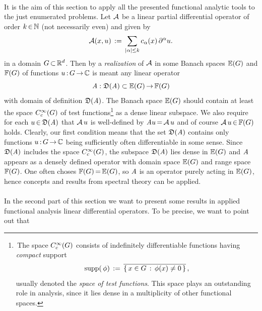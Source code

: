 \documentclass[11pt,twoside]{article}
\begin{document}
\paragraph{} %
It is the aim of this section to apply
all the presented functional analytic tools to the just enumerated problems.
Let ${\mathcal{A}}$ be a linear partial differential operator of order $k {\,\in\,} {\mathbb{N}}$
(not necessarily even) and given by
\begin{equation}\label{ANY_ORDER_LPDO}
\A(x,u) \eqdef
\sum_{\abs{\alpha} \leq k} c_{\alpha}(x) \, \PA u.
\end{equation}
in a domain $G {\,\subset\,} {\mathbb{R}}^d$.
Then by a \textit{realization} of ${\mathcal{A}}$ in some Banach spaces
$\mathbb{E}(G)$ and $\mathbb{F}(G)$ of functions $u {\,:\,} G {\,\to\,} {\mathbb{C}}$
is meant any linear operator
\[
\mathit{A}: \mathfrak{D}(\mathit{A}) \subset \mathbb{E}(G) {\,\to\,} \mathbb{F}(G)
\]
with domain of definition $\mathfrak{D}(\mathit{A})$.
The Banach space $\mathbb{E}(G)$ should contain at least
the space $C_c^{\infty}(G)$ of test functions\footnote{
\,The space $C_c^{\infty}(G)$ consists of indefinitely differentiable functions
having \textit{compact} support
\[
\operatorname{supp}(\,\phi) \,:=\, \overline{\{ \, x \in G \,: \, \phi(x) \neq 0 \, \}}\,,
\]
usually denoted the \textit{space of test functions}.
This space plays an out\-standing role in analysis,
since it lies dense in a multiplicity of other functional spaces.}
as a dense linear subspace.
We also require for each $u {\,\in\,} \mathfrak{D}(\mathit{A})$ that
${\mathcal{A}} \, u$ is well-defined by $\mathit{A} u {\,=\,} {\mathcal{A}} \, u$ and of course
${\mathcal{A}} \, u {\,\in\,} \mathbb{F}(G)$ holds.
Clearly,
our first condition means that the set $\mathfrak{D}(\mathit{A})$
contains only functions $u {\,:\,} G {\,\to\,} {\mathbb{C}}$
being sufficiently often differentiable in some sense.
Since $\mathfrak{D}(\mathit{A})$ includes the space $C_c^{\infty}(G)$,
the subspace $\mathfrak{D}(\mathit{A})$ lies dense in $\mathbb{E}(G)$
and $\mathit{A}$ appears as a densely defined operator
with domain space $\mathbb{E}(G)$ and range space $\mathbb{F}(G)$.
One often choses $\mathbb{F}(G) {\,=\,} \mathbb{E}(G)$,
so $\mathit{A}$ is an operator purely acting in $\mathbb{E}(G)$,
hence concepts and results from spectral theory can be applied.

\paragraph{} %
In the second part of this section we want to present some results
in applied functional analysis {\wrt} linear differential operators.
To be precise, we want to point out that
\end{document}
